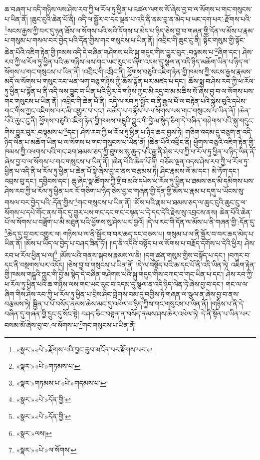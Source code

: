 ཆ་བཞག་པ་འདི་གཉིས་ལས་ཤེས་རབ་ཀྱི་ཕ་རོལ་ཏུ་ཕྱིན་པ་འཚལ་ལགས་སོ་ཞེས་བྱ་བ་ལ་སོགས་པ་གང་གསུངས་པ་ཡིན་ནོ། །ཆུང་ངུའི་ཆེན་པོ་ནི། འདི་ལ་སྦྱོར་བ་དང་ལྡན་པ་འདི་ནི་ནམ་བླ་ན་མེད་པ་ཡང་དག་པར་:རྫོགས་པའི་\footnote{«སྣར་»«པེ་»རྫོགས་པའི་བྱང་ཆུབ་མངོན་པར་རྫོགས་པར་}སངས་རྒྱས་ཀྱི་བར་དུ་ཉན་ཐོས་ལ་སོགས་པའི་སའི་དོགས་པ་མེད་པ་ཉིད་ཅེས་བྱ་བ་གཞན་གྱི་དོན་ལ་མོས་པ་རྣམ་པ་གསུམ་པ་གསལ་བར་བྱེད་པའི་དོན་གྱིས་གང་གསུངས་པ་ཡིན་ནོ། །འབྲིང་གི་ཆུང་ངུ་ནི། སྟོང་གསུམ་གྱི་སྟོང་ཆེན་པོའི་འཇིག་རྟེན་གྱི་ཁམས་འདི་དེ་བཞིན་གཤེགས་པའི་སྐུ་གདུང་གིས་བྱུར་བུར་:བལྟམས་པ་\footnote{«སྣར་»«པེ་»གཏམས་པ་}ཞིག་དང་། ཤེས་རབ་ཀྱི་ཕ་རོལ་ཏུ་ཕྱིན་པའི་ཆ་གཉིས་ལས་གང་ཡང་རུང་བ་ཞིག་འདམ་དུ་སྩལ་ན་འདི་ཉིད་མཆོག་ཡིན་པ་ཉིད་ལ་སོགས་པ་གང་གསུངས་པ་ཡིན་ནོ། །འབྲིང་གི་འབྲིང་ནི། ཕྱོགས་བཅུའི་འཇིག་རྟེན་གྱི་ཁམས་ཀྱི་སངས་རྒྱས་རྣམས་མདོ་ལ་སོགས་པ་གསུང་རབ་ཡན་ལག་བཅུ་གཉིས་ཀྱི་ཆོས་སྟོན་པར་མཛད་པ་དང་། ཆོས་སྨྲ་བ་ཤེས་རབ་ཀྱི་ཕ་རོལ་ཏུ་ཕྱིན་པ་སྟོན་པ་ནི་འདི་ལས་བྱུང་བ་ཡིན་པའི་ཕྱིར་དེ་གཉིས་ཀྱང་མི་འདྲ་བ་མ་མཆིས་སོ་ཞེས་བྱ་བ་ལ་སོགས་པས་གང་གསུངས་པ་ཡིན་ནོ། །འབྲིང་གི་ཆེན་པོ་ནི། འདི་ལ་རབ་ཏུ་སྦྱོར་བ་ནི་རྒྱལ་པོ་ལ་བརྟེན་པའི་སྐྱེས་བུའི་དཔེས་གང་གིས་ཀྱང་འཇིགས་པར་མི་འགྱུར་བ་དང་། མཆོད་པ་བརྙེས་པ་ལ་སོགས་པས་གང་གསུངས་པ་ཡིན་ནོ། །ཆེན་པོའི་ཆུང་ངུ་ནི། ཕྱོགས་བཅུའི་འཇིག་རྟེན་གྱི་ཁམས་གངྒཱའི་ཀླུང་གི་བྱེ་མ་སྙེད་ཅིག་དེ་བཞིན་གཤེགས་པའི་སྐུ་གདུང་གིས་བྱུར་བུར་:བལྟམས་པ་\footnote{«སྣར་»གཏམས་པ་«པེ་»གདམས་པ་}དང་། ཤེས་རབ་ཀྱི་ཕ་རོལ་ཏུ་ཕྱིན་པ་ཉིད་ཆར་བྱས་ཏེ། གཅིག་འདམ་དུ་བཅུག་ན་འདི་ཉིད་ལེན་པ་མཆོག་ཡིན་པ་ལ་སོགས་པ་གང་གསུངས་པ་ཡིན་ནོ། །ཆེན་པོའི་འབྲིང་ནི། ཕྱོགས་བཅུའི་འཇིག་རྟེན་གྱི་ཁམས་ཀྱི་འཕགས་པའི་གང་ཟག་ཐམས་ཅད་ཀྱི་ཐུགས་སུ་ཆུད་པའི་རྒྱུ་ནི་ཤེས་རབ་ཀྱི་ཕ་རོལ་ཏུ་ཕྱིན་པ་ཉིད་ཡིན་ནོ་ཞེས་བྱ་བ་ལ་སོགས་པ་གང་གསུངས་པ་ཡིན་ནོ། །ཆེན་པོའི་ཆེན་པོ་ནི། བཅོམ་ལྡན་འདས་ཤེས་རབ་ཀྱི་ཕ་རོལ་ཏུ་ཕྱིན་པ་འདི་ནི་ཕ་རོལ་ཏུ་ཕྱིན་པ་ཆེན་པོ་སྟེ་ཞེས་བྱ་བ་ནས་བརྩམས་ཏེ། ཤིང་རྣམས་ལོ་མ་དང་། མེ་ཏོག་དང་། འབྲས་བུ་དང་། དབྱིབས་དང་། ཆུ་ཞེང་སྣ་ཚོགས་ཀྱི་གྲིབ་མའི་དཔེས་ཕ་རོལ་ཏུ་ཕྱིན་པ་ཐམས་ཅད་མི་དམིགས་པས་ཤེས་རབ་ཀྱི་ཕ་རོལ་ཏུ་ཕྱིན་པར་རོ་གཅིག་པ་ཉིད་ཅེས་བྱ་བ་གཞན་གྱི་དོན་གྱི་མོས་པ་རྣམ་པ་དགུ་པ་ཡོངས་སུ་གསལ་བར་བྱེད་པའི་:དོན་གྱིས་\footnote{«སྣར་»«པེ་»དོན་གྱི་}གང་གསུངས་པ་ཡིན་ནོ། །མོས་པའི་རྣམ་པ་ཐམས་ཅད་ལ་ཆུང་ངུའི་ཆུང་ངུ་ལ་སོགས་པ་དཔེ་གོང་ནས་གོང་དུ་གྱུར་པས་གང་དང་གང་བསྟན་པ་དེ་དང་དེའི་རྗེས་སུ་འབྲངས་ནས། ཆེན་པོའི་ཆེན་པོ་ལ་སོགས་པ་བཟློག་པ་མི་མཐུན་པའི་ཕྱོགས་སུ་ཤེས་པར་བྱའོ། །དེ་ལ་རང་གི་དོན་ལ་མོས་པ་ནི་གཞན་གྱི་:དོན་དུ་\footnote{«སྣར་»«པེ་»དོན་གྱི་}ཆེད་དུ་བྱ་བར་འགྱུར་ལ། གཉིས་པ་ལ་ནི་སྦྱོར་བ་བར་ཆད་དང་བཅས་པ། གསུམ་པ་ལ་ནི་སྦྱོར་བ་བར་ཆད་མེད་པ་ཡིན་ནོ། །མོས་པ་ཡིད་ལ་བྱེད་པ་བཤད་ཟིན་ཏོ།། །།ད་ནི་འདིའི་བསྟོད་པ་ལ་སོགས་པ་བརྗོད་དགོས་པ་དེའི་ཕྱིར། ཤེས་རབ་ཕ་རོལ་ཕྱིན་པ་ལ།\footnote{«སྣར་»ལས།} །མོས་པའི་གནས་སྐབས་རྣམས་ལ་ནི། །དགུ་ཚན་གསུམ་གྱིས་བསྟོད་པ་དང་། །བཀུར་བ་དང་ནི་བསྔགས་པར་འདོད། །ཅེས་བྱ་བ་གསུངས་པ་ཡིན་ནོ། །དེ་ལ་བསྟོད་པའི་ཆ་དང་པོ་ནི་འདི་ཡིན་ཏེ། འཇིག་རྟེན་གྱི་ཁམས་གངྒཱའི་ཀླུང་གི་བྱེ་མ་སྙེད་དེ་བཞིན་གཤེགས་པའི་སྐུ་གདུང་གིས་བཀང་བ་གང་ཡིན་པ་དང་། ཤེས་རབ་ཀྱི་ཕ་རོལ་ཏུ་ཕྱིན་པའི་ཆ་གཉིས་ལས་གང་ཡང་རུང་བ་འདམ་དུ་སྩལ་ན་འདི་ཉིད་ལེན་ཏེ་ཞེས་བྱ་བ་དང་། གང་ལ་ལ་ཞིག་གིས་ཤེས་རབ་ཀྱི་ཕ་རོལ་ཏུ་ཕྱིན་པ་བྲིས་ཤིང་གླེགས་བམ་དུ་བགྱིས་ཏེ་གཞན་ལ་སྩལ་ན་ཞེས་བྱ་བ་ནས་བརྩམས་ཏེ། སྦྱིན་པ་པོ་བསོད་ནམས་ཆེས་མང་དུ་འཕེལ་བ་ཉིད་ཀྱིས་གང་གསུངས་པ་ཡིན་ནོ། །གཉིས་པ་ནི་དེ་བཞིན་དུ་གཞན་གྱི་དྲུང་དུ་སོང་སྟེ། བཤད་ཅིང་བསྟན་ན་བསོད་ནམས་ཤས་ཆེར་འཕེལ་ཏེ། དེ་ནི་སྟོན་པ་ཡིན་པར་བསམ་མོ་ཞེས་བྱ་བ་:ལ་སོགས་པ་\footnote{«སྣར་»«པེ་»ལ་སོགས་}གང་གསུངས་པ་ཡིན་ནོ། 